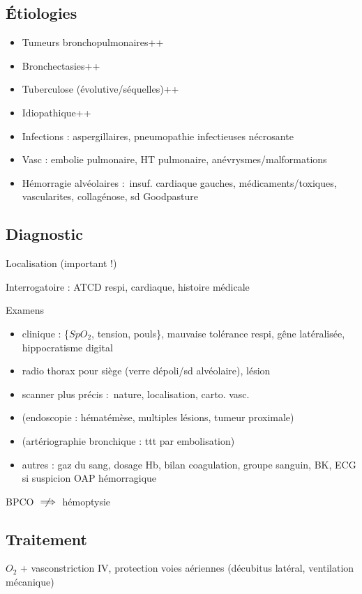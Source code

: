 \subsection{Étiologies}
\begin{itemize}
\item Tumeurs bronchopulmonaires++
\item Bronchectasies++
\item Tuberculose (évolutive/séquelles)++
\item Idiopathique++
\item Infections : aspergillaires, pneumopathie infectieuses nécrosante
\item Vasc : embolie pulmonaire, HT pulmonaire, anévrysmes/malformations
\item Hémorragie alvéolaires : insuf. cardiaque gauches, médicaments/toxiques,
  vascularites, collagénose, sd Goodpasture
\end{itemize}

\subsection{Diagnostic}
Localisation (important !)

Interrogatoire : ATCD respi, cardiaque, histoire médicale

Examens 
\begin{itemize}
\item clinique : \{$SpO_2$, tension, pouls\}, mauvaise tolérance respi, gêne
  latéralisée, hippocratisme digital
\item radio thorax pour siège (verre dépoli/sd alvéolaire), lésion
\item scanner plus précis : nature, localisation, carto. vasc.
\item (endoscopie : hématémèse, multiples lésions, tumeur proximale)
\item (artériographie bronchique : ttt par embolisation)
\item autres : gaz du sang, dosage Hb, bilan coagulation, groupe sanguin, {BK,
    ECG} si suspicion OAP hémorragique
\end{itemize}

\danger BPCO $\centernot\implies$ hémoptysie

\subsection{Traitement}
$O_2$ + vasconstriction IV, protection voies aériennes (décubitus latéral,
ventilation mécanique)

